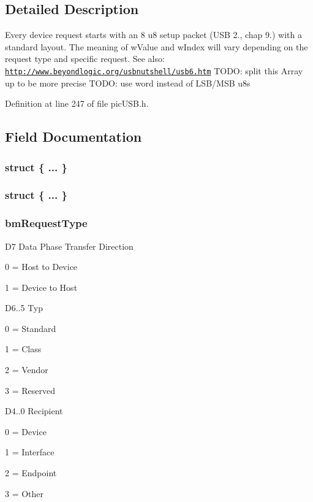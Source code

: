 \subsection{Detailed Description}
Every device request starts with an 8 u8 setup packet (U\-S\-B 2., chap 9.) with a standard layout. The meaning of w\-Value and w\-Index will vary depending on the request type and specific request. See also\-: \href{http://www.beyondlogic.org/usbnutshell/usb6.htm}{\tt http\-://www.\-beyondlogic.\-org/usbnutshell/usb6.\-htm} T\-O\-D\-O\-: split this Array up to be more precise T\-O\-D\-O\-: use word instead of L\-S\-B/\-M\-S\-B u8s 

Definition at line 247 of file pic\-U\-S\-B.\-h.



\subsection{Field Documentation}
\hypertarget{unionsetup_packet_struct_adee8f6f4b5b95019dcf3a15910522a0c}{\subsubsection[{"@22}]{\setlength{\rightskip}{0pt plus 5cm}struct \{ ... \} }}\label{unionsetup_packet_struct_adee8f6f4b5b95019dcf3a15910522a0c}
\hypertarget{unionsetup_packet_struct_a6f16f38fe8076d1ee4972cb6c227edb0}{\subsubsection[{"@24}]{\setlength{\rightskip}{0pt plus 5cm}struct \{ ... \} }}\label{unionsetup_packet_struct_a6f16f38fe8076d1ee4972cb6c227edb0}
\hypertarget{unionsetup_packet_struct_a9119649a830686614e70e2e8d42c91d3}{
\subsubsection[{bm\-Request\-Type}]{ bm\-Request\-Type}}\label{unionsetup_packet_struct_a9119649a830686614e70e2e8d42c91d3}
D7 Data Phase Transfer Direction
\begin{DoxyItemize}
\item 0 = Host to Device
\item 1 = Device to Host
\end{DoxyItemize}D6..5 Typ
\begin{DoxyItemize}
\item 0 = Standard
\item 1 = Class
\item 2 = Vendor
\item 3 = Reserved
\end{DoxyItemize}D4..0 Recipient
\begin{DoxyItemize}
\item 0 = Device
\item 1 = Interface
\item 2 = Endpoint
\item 3 = Other
\end{DoxyItemize}

